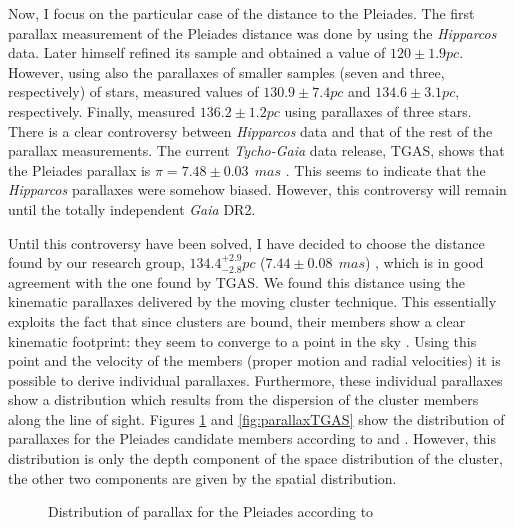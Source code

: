 Now, I focus on the particular case of the distance to the Pleiades. The first parallax measurement of the Pleiades distance was done by \citet{1999A&A...341L..71V} using the \emph{Hipparcos} data. Later himself \citep{2009A&A...497..209V} refined its sample and obtained a value of $120\pm1.9pc$. However, \citet{2000ApJ...533..938G, 2005AJ....129.1616S} using also the parallaxes of smaller samples (seven and three, respectively) of stars, measured values of $130.9\pm7.4pc$ and $134.6\pm3.1pc$, respectively. Finally, \citet{2014Sci...345.1029M} measured $136.2\pm1.2pc$ using parallaxes of three stars. There is a clear controversy between \emph{Hipparcos} data and that of the rest of the parallax measurements. The current \emph{Tycho-Gaia} data release, TGAS, shows that the Pleiades parallax is $\pi = 7.48\pm0.03\ \ mas$ \citep{2017A&A...601A..19G}. This seems to indicate that the \emph{Hipparcos} parallaxes were somehow biased. However, this controversy will remain until the totally independent \emph{Gaia} DR2.

Until this controversy have been solved, I have decided to choose the distance found by our research group, $134.4^{+2.9}_{-2.8}pc$ ($7.44\pm0.08\ \ mas$) \citep{Galli2017}, which is in good agreement with the one found by TGAS. We found this distance using the kinematic parallaxes delivered by the moving cluster technique. This essentially exploits the fact that since clusters are bound, their members show a clear kinematic footprint: they seem to converge to a point in the sky \citep{1964IAUS...20...50B}. Using this point and the velocity of the members (proper motion and radial velocities) it is possible to derive individual parallaxes. Furthermore, these individual parallaxes show a distribution which results from the dispersion of the cluster members along the line of sight. Figures \ref{fig:parallaxPhillip} and \ref{fig:parallaxTGAS} show the distribution of parallaxes for the Pleiades candidate members according to \citet{Galli2017} and \citet{2017A&A...601A..19G}. However, this distribution is only the depth component of the space distribution of the cluster, the other two components are given by the spatial distribution. 

\begin{figure}[htbp]
\begin{center}
\caption{Distribution of parallax for the Pleiades according to \citet{Galli2017}}
\label{fig:parallaxPhillip}
\end{center}
\end{figure}

